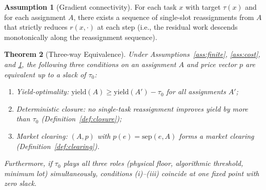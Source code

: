 \documentclass[11pt,twocolumn,a4paper]{article}
\theoremstyle{plain}
\newtheorem{theorem}{Theorem}[section]
\theoremstyle{definition}
\newtheorem{assumption}[theorem]{Assumption}
\theoremstyle{remark}
\newcommand{\tick}{\tau_0}
\newcommand{\sep}{\mathrm{sep}}
\newcommand{\yield}{\mathrm{yield}}
\begin{document}
\begin{assumption}[Gradient connectivity]
\label{ass:gradient}
For each task $x$ with target $\tau(x)$ and for each assignment $A$, there exists a sequence of single-slot reassignments from $A$ that strictly reduces $r(x, \cdot)$ at each step (i.e., the residual work descends monotonically along the reassignment sequence).
\end{assumption}

\begin{theorem}[Three-way Equivalence]
\label{thm:trinity}
Under Assumptions~\ref{ass:finite}, \ref{ass:cost}, and \ref{ass:gradient}, the following three conditions on an assignment $A$ and price vector $p$ are equivalent up to a slack of $\tick$:
\begin{enumerate}[label=(\roman*)]
\item \emph{Yield-optimality}: $\yield(A) \geq \yield(A') - \tick$ for all assignments $A'$;
\item \emph{Deterministic closure}: no single-task reassignment improves yield by more than $\tick$ (Definition~\ref{def:closure});
\item \emph{Market clearing}: $(A, p)$ with $p(e) = \sep(e, A)$ forms a market clearing (Definition~\ref{def:clearing}).
\end{enumerate}
Furthermore, if $\tick$ plays all three roles (physical floor, algorithmic threshold, minimum lot) simultaneously, conditions (i)--(iii) coincide at one fixed point with zero slack.
\end{theorem}
\end{document}
